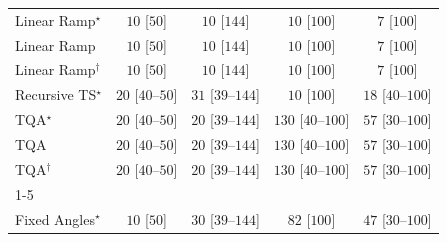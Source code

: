 \begin{tabular}{l|cccc|}
Linear Ramp$^\star$ & {\cellcolor[HTML]{F7FCF5}} \color[HTML]{000000} $10$ [$50$] & {\cellcolor[HTML]{F7FCF5}} \color[HTML]{000000} $10$ [$144$] & {\cellcolor[HTML]{F7FCF5}} \color[HTML]{000000} $10$ [$100$] & {\cellcolor[HTML]{F7FCF5}} \color[HTML]{000000} $7$ [$100$] \\
Linear Ramp & {\cellcolor[HTML]{F7FCF5}} \color[HTML]{000000} $10$ [$50$] & {\cellcolor[HTML]{F7FCF5}} \color[HTML]{000000} $10$ [$144$] & {\cellcolor[HTML]{F7FCF5}} \color[HTML]{000000} $10$ [$100$] & {\cellcolor[HTML]{F7FCF5}} \color[HTML]{000000} $7$ [$100$] \\
Linear Ramp$^\dagger$ & {\cellcolor[HTML]{F7FCF5}} \color[HTML]{000000} $10$ [$50$] & {\cellcolor[HTML]{F7FCF5}} \color[HTML]{000000} $10$ [$144$] & {\cellcolor[HTML]{F7FCF5}} \color[HTML]{000000} $10$ [$100$] & {\cellcolor[HTML]{F7FCF5}} \color[HTML]{000000} $7$ [$100$] \\
Recursive TS$^\star$ & {\cellcolor[HTML]{F5FBF2}} \color[HTML]{000000} $20$ [$40$--$50$] & {\cellcolor[HTML]{F3FAF0}} \color[HTML]{000000} $31$ [$39$--$144$] & {\cellcolor[HTML]{F7FCF5}} \color[HTML]{000000} $10$ [$100$] & {\cellcolor[HTML]{F5FBF3}} \color[HTML]{000000} $18$ [$40$--$100$] \\
TQA$^\star$ & {\cellcolor[HTML]{F5FBF2}} \color[HTML]{000000} $20$ [$40$--$50$] & {\cellcolor[HTML]{F5FBF2}} \color[HTML]{000000} $20$ [$39$--$144$] & {\cellcolor[HTML]{DFF3DA}} \color[HTML]{000000} $130$ [$40$--$100$] & {\cellcolor[HTML]{EFF9EB}} \color[HTML]{000000} $57$ [$30$--$100$] \\
TQA & {\cellcolor[HTML]{F5FBF2}} \color[HTML]{000000} $20$ [$40$--$50$] & {\cellcolor[HTML]{F5FBF2}} \color[HTML]{000000} $20$ [$39$--$144$] & {\cellcolor[HTML]{DFF3DA}} \color[HTML]{000000} $130$ [$40$--$100$] & {\cellcolor[HTML]{EFF9EB}} \color[HTML]{000000} $57$ [$30$--$100$] \\
TQA$^\dagger$ & {\cellcolor[HTML]{F5FBF2}} \color[HTML]{000000} $20$ [$40$--$50$] & {\cellcolor[HTML]{F5FBF2}} \color[HTML]{000000} $20$ [$39$--$144$] & {\cellcolor[HTML]{DFF3DA}} \color[HTML]{000000} $130$ [$40$--$100$] & {\cellcolor[HTML]{EFF9EB}} \color[HTML]{000000} $57$ [$30$--$100$] \\
\cline{1-5}
\multicolumn{5}{c}{\rule{0pt}{8pt}PP} \\
\midrule
Fixed Angles$^\star$ & {\cellcolor[HTML]{F7FCF5}} \color[HTML]{000000} $10$ [$50$] & {\cellcolor[HTML]{F3FAF0}} \color[HTML]{000000} $30$ [$39$--$144$] & {\cellcolor[HTML]{EAF7E6}} \color[HTML]{000000} $82$ [$100$] & {\cellcolor[HTML]{F0F9ED}} \color[HTML]{000000} $47$ [$30$--$100$] \\

\end{tabular}
